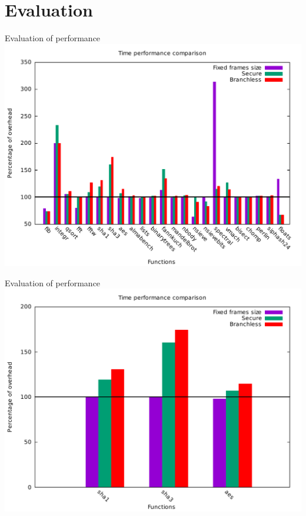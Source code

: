 \documentclass{beamer}
\begin{document}
\section{Evaluation}
\label{sec:Implementation}

\begin{frame}[c]{Evaluation of performance }
	\includegraphics[width=\textwidth]{images/time_percentage_graph.pdf}
\end{frame}

\begin{frame}[c]{Evaluation of performance }
	\includegraphics[width=\textwidth]{images/percentage_focus.pdf}
\end{frame}
\end{document}

